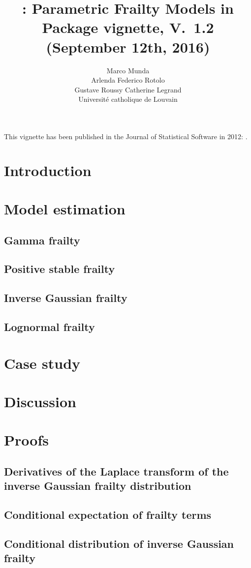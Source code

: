 \documentclass[nojss]{jss}
\author{Marco Munda\\Arlenda \And 
        Federico Rotolo\\Gustave Roussy \And
        Catherine Legrand\\Universit\'e catholique de Louvain}
\title{\pkg{parfm}: Parametric Frailty Models in \proglang{R}
        \\[.5em]\small{Package vignette, V.~1.2 (September 12th, 2016)}}
\begin{document}
This vignette has been published in the Journal of Statistical Software in 2012:
\cite{MundaEtal12}.

\section{Introduction}
  \label{sec:intro}
  

\section{Model estimation}
  \label{sec:model}
    
  \clearpage
  \subsection{Gamma frailty}
    \label{sec:model:gamma}
    
  \subsection{Positive stable frailty}
    \label{sec:model:PS}
    
  \subsection{Inverse Gaussian frailty}
    \label{sec:model:IG}
    
  \subsection{Lognormal frailty}
    \label{sec:model:LN}
    

\section{Case study}
  \label{sec:rexample}
  
  
\section{Discussion}
  \label{sec:concl}
  


% 


\clearpage
\appendix
\section{Proofs}
\subsection{Derivatives of the Laplace transform of the inverse Gaussian frailty distribution} 
  \label{app:derLTIG}
  
  
\clearpage
\subsection{Conditional expectation of frailty terms}
  \label{app:condEfrailty}
  

\clearpage
\subsection{Conditional distribution of inverse Gaussian frailty} 
  \label{app:condIG}
  
\end{document}
